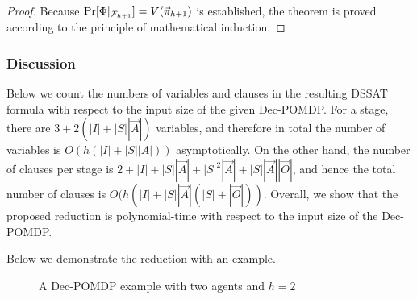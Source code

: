 \begin{proof}
    Because $\Pr[\Phi|_{\mathcal{F}_{h+1}}]=V(\vec{\pi}_{h+1})$ is established,
    the theorem is proved according to the principle of mathematical induction.
\end{proof}

\subsubsection{Discussion}
Below we count the numbers of variables and clauses in the resulting DSSAT formula with respect to the input size of the given Dec-POMDP.
For a stage,
there are $3+2(|I|+|S||\vec{A}|)$ variables,
and therefore in total the number of variables is $O(h(|I|+|S||A|))$ asymptotically.
On the other hand,
the number of clauses per stage is $2+|I|+|S||\vec{A}|+|S|^2|\vec{A}|+|S||\vec{A}||\vec{O}|$,
and hence the total number of clauses is $O(h(|I|+|S||\vec{A}|(|S|+|\vec{O}|))$.
Overall, we show that the proposed reduction is polynomial-time with respect to the input size of the Dec-POMDP.

Below we demonstrate the reduction with an example.

\begin{figure}[t]
    \centering
    
    \caption{A Dec-POMDP example with two agents and $h=2$}
    \label{fig:dssat-dec-pomdp-example}
\end{figure}

